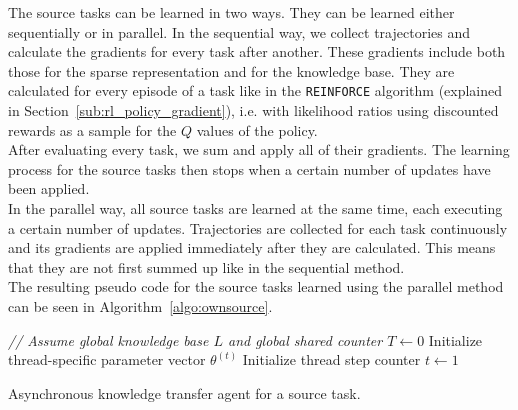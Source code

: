 The source tasks can be learned in two ways. They can be learned either sequentially or in parallel.
In the sequential way, we collect trajectories and calculate the gradients for every task after another. These gradients include both those for the sparse representation and for the knowledge base. They are calculated for every episode of a task like in the \texttt{REINFORCE} algorithm (explained in Section~\ref{sub:rl_policy_gradient}), i.e. with likelihood ratios using discounted rewards as a sample for the $Q$ values of the policy.\\
After evaluating every task, we sum and apply all of their gradients. The learning process for the source tasks then stops when a certain number of updates have been applied.\\
In the parallel way, all source tasks are learned at the same time, each executing a certain number of updates. Trajectories are collected for each task continuously and its gradients are applied immediately after they are calculated. This means that they are not first summed up like in the sequential method.\\
The resulting pseudo code for the source tasks learned using the parallel method can be seen in Algorithm~\ref{algo:ownsource}.\\
\begin{algorithm}[htb]
\DontPrintSemicolon
\emph{// Assume global knowledge base $L$ and global shared counter $T \gets 0$}\;
Initialize thread-specific parameter vector $\theta^{(t)}$\;
Initialize thread step counter $t\gets 1$\;
\caption[Asynchronous knowledge transfer agent for a source task]{Asynchronous knowledge transfer agent for a source task.}
\label{algo:ownsource}
\end{algorithm}

